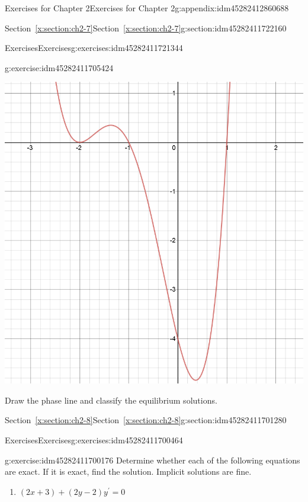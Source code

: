 \documentclass[oneside,10pt,]{book}
\numberwithin{equation}{section}
\numberwithin{equation}{section}
\begin{document}
\begin{appendixptx}{Exercises for Chapter 2}{}{Exercises for Chapter 2}{}{}{g:appendix:idm45282412860688}
\begin{sectionptx}{Section~\ref*{x:section:ch2-7}}{}{Section~\ref*{x:section:ch2-7}}{}{}{g:section:idm45282411722160}
\begin{exercises-subsection-numberless}{Exercises}{}{Exercises}{}{}{g:exercises:idm45282411721344}
\begin{divisionexercise}{4}{}{}{g:exercise:idm45282411705424}
\begin{image}{0}{1}{0}
\includegraphics[width=\linewidth]{images/2.7-4.png}
\end{image}%
Draw the phase line and classify the equilibrium solutions.%
\end{divisionexercise}%
\end{exercises-subsection-numberless}
\end{sectionptx}
%
%
\typeout{************************************************}
\typeout{************************************************}
%
\begin{sectionptx}{Section~\ref*{x:section:ch2-8}}{}{Section~\ref*{x:section:ch2-8}}{}{}{g:section:idm45282411701280}
%
%
\typeout{************************************************}
\typeout{************************************************}
%
\begin{exercises-subsection-numberless}{Exercises}{}{Exercises}{}{}{g:exercises:idm45282411700464}
\begin{divisionexercise}{1}{}{}{g:exercise:idm45282411700176}%
Determine whether each of the following equations are exact. If it is exact, find the solution. Implicit solutions are fine. %
\begin{enumerate}[label=(\alph*)]
\item{}\({\displaystyle \left(2x+3\right)+\left(2y-2\right)y^{\prime}=0}\)%

\end{enumerate}
\end{divisionexercise}
\end{exercises-subsection-numberless}
\end{sectionptx}
\end{appendixptx}
\end{document}
